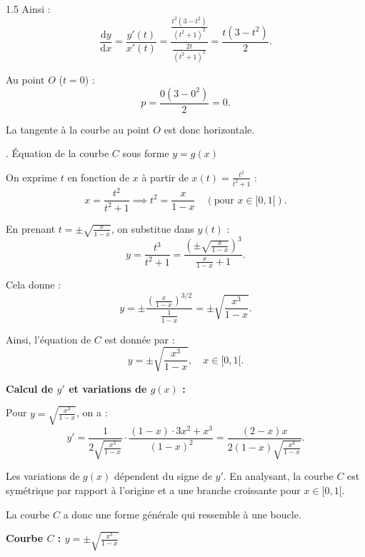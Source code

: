 \documentclass[12pt]{article}
\begin{document}
\begin{spacing}{1.5}
Ainsi :
\[
\frac{\mathrm{d}y}{\mathrm{d}x} = \frac{y'(t)}{x'(t)} = \frac{\frac{t^2(3 - t^2)}{(t^2 + 1)^2}}{\frac{2t}{(t^2 + 1)^2}} = \frac{t(3 - t^2)}{2}.
\]

Au point \(O\) (\(t = 0\)) :
\[
p = \frac{0(3 - 0^2)}{2} = 0.
\]

La tangente à la courbe au point \(O\) est donc horizontale.

. Équation de la courbe \(C\) sous forme \(y = g(x)\)

On exprime \(t\) en fonction de \(x\) à partir de \(x(t) = \frac{t^2}{t^2 + 1}\) :
\[
x = \frac{t^2}{t^2 + 1} \implies t^2 = \frac{x}{1 - x} \quad (\text{pour } x \in [0, 1[).
\]

En prenant \(t = \pm\sqrt{\frac{x}{1 - x}}\), on substitue dans \(y(t)\) :
\[
y = \frac{t^3}{t^2 + 1} = \frac{\left(\pm\sqrt{\frac{x}{1 - x}}\right)^3}{\frac{x}{1 - x} + 1}.
\]

Cela donne :
\[
y = \pm\frac{\left(\frac{x}{1 - x}\right)^{3/2}}{\frac{1}{1 - x}} = \pm \sqrt{\frac{x^3}{1 - x}}.
\]

Ainsi, l'équation de \(C\) est donnée par :
\[
y = \pm\sqrt{\frac{x^3}{1 - x}}, \quad x \in [0, 1[.
\]

\textbf{Calcul de \(y'\) et variations de \(g(x)\) :}

Pour \(y = \sqrt{\frac{x^3}{1 - x}}\), on a :
\[
y' = \frac{1}{2\sqrt{\frac{x^3}{1 - x}}} \cdot \frac{(1 - x) \cdot 3x^2 + x^3}{(1 - x)^2} = \frac{(2 - x)x}{2(1 - x)\sqrt{\frac{x^3}{1 - x}}}.
\]

Les variations de \(g(x)\) dépendent du signe de \(y'\). En analysant, la courbe \(C\) est symétrique par rapport à l'origine et a une branche croissante pour \(x \in [0, 1[\).

La courbe \(C\) a donc une forme générale qui ressemble à une boucle.





\quad


\begin{center}
\textbf{Courbe \(C\) : \(y = \pm \sqrt{\frac{x^3}{1-x}}\)}


\end{center}
\end{spacing}
\end{document}
